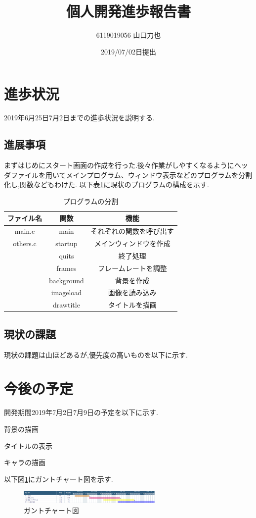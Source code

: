 \documentclass{jarticle}
\title{個人開発進歩報告書}
\author{6119019056 山口力也}
\date{2019/07/02日提出}
\begin{document}
\maketitle
\section{進歩状況}
2019年6月25日\~7月2日までの進歩状況を説明する.

\subsection{進展事項}
まずはじめにスタート画面の作成を行った.後々作業がしやすくなるようにヘッダファイルを用いてメインプログラム、ウィンドウ表示などのプログラムを分割化し,関数などもわけた.
以下表\ref{table:bunkatu}に現状のプログラムの構成を示す.

\begin{table}[H]
\caption{プログラムの分割}
	\begin{center}
		\begin{tabular}{|c|c|c|}\hline \hline
		 ファイル名 &関数 & 機能 \\ \hline
		main.c & main & それぞれの関数を呼び出す \\ \hline 
		others.c & startup &メインウィンドウを作成 \\ 
		 & quits& 終了処理 \\ 
		& frames & フレームレートを調整 \\ 
		& background & 背景を作成\\ 
		& imageload & 画像を読み込み\\ 
		& drawtitle & タイトルを描画 \\ \hline
		\end{tabular}
	\end{center}
\label{table:bunkatu} 
\end{table}

\subsection{現状の課題}
現状の課題は山ほどあるが,優先度の高いものを以下に示す.

\section{今後の予定}
開発期間2019年7月2日\~7月9日の予定を以下に示す.

 
\begin{itemize}
\begin{item}
\item 背景の描画
\item タイトルの表示
\item キャラの描画
\end{item}
\end{itemize}
以下図\ref{fig:chart}にガントチャート図を示す.


\begin{figure}[H]
\begin{center}
\includegraphics[width=7.0cm]{chart.png}
\caption{ガントチャート図}
\label{fig:chart}
\end{center}
\end{figure}
\end{document}
